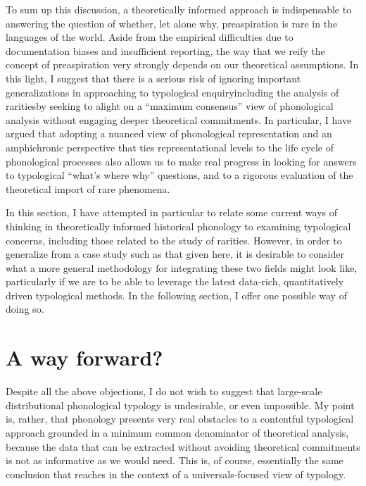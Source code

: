 \documentclass[output=paper,colorlinks,citecolor=brown]{langscibook}
\begin{document}
To sum up this discussion, a theoretically informed approach is indispensable to answering the question of whether, let alone why, preaspiration is rare in the languages of the world. Aside from the empirical difficulties due to documentation biases and insufficient reporting, the way that we reify the concept of preaspiration very strongly depends on our theoretical assumptions. In this light, I suggest that there is a serious risk of ignoring important generalizations in approaching to typological enquiry\dash including the analysis of rarities\dash by seeking to alight on a \enquote{maximum consensus} view of phonological analysis without engaging deeper theoretical commitments. In particular, I have argued that adopting a nuanced view of phonological representation and an amphichronic perspective that ties representational levels to the life cycle of phonological processes also allows us to make real progress in looking for answers to typological \enquote{what's where why} questions, and to a rigorous evaluation of the theoretical import of rare phenomena.

In this section, I have attempted in particular to relate some current ways of thinking in theoretically informed historical phonology to examining typological concerns, including those related to the study of rarities. However, in order to generalize from a case study such as that given here, it is desirable to consider what a more general methodology for integrating these two fields might look like, particularly if we are to be able to leverage the latest data\hyp rich, quantitatively driven typological methods. In the following section, I offer one possible way of doing so.

\section{A way forward?}
\label{sec:way-forward}

Despite all the above objections, I do not wish to suggest that large-scale distributional phonological typology is undesirable, or even impossible. My point is, rather, that phonology presents very real obstacles to a contentful typological approach grounded in a minimum common denominator of theoretical analysis, because the data that can be extracted without avoiding theoretical commitments is not as informative as we would need. This is, of course, essentially the same conclusion that \textcite{hyman08:_univer} reaches in the context of a universals-focused view of typology.
\end{document}

